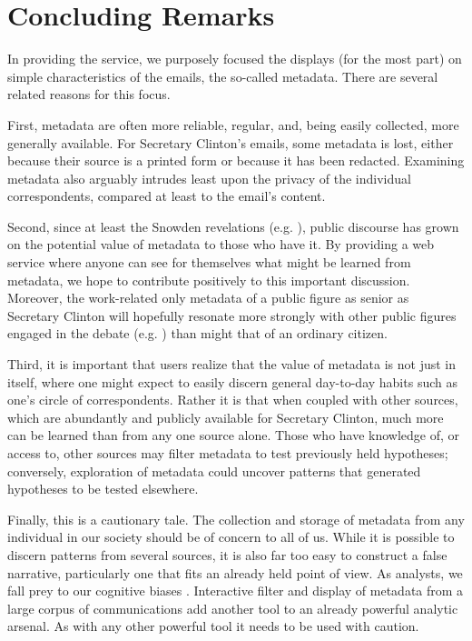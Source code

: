 \documentclass[journal]{vgtc}                %
\begin{document}
\section{Concluding Remarks}
In providing the service, we purposely focused the displays (for the most part) on simple characteristics of the emails, the so-called metadata.  There are several related reasons for this focus.  

First, metadata are often more reliable, regular, and, being easily collected, more generally available.  For Secretary Clinton's emails,  some metadata is lost, either because their source is a printed form or because it has been redacted.  Examining metadata also arguably intrudes least upon the privacy of the individual correspondents, compared at least to the email's content.  

Second, since at least the Snowden revelations (e.g. \cite{NYRsnowdenLeaks}), public discourse has grown on the potential value of metadata to those who have it.  By providing a web service where anyone can see for themselves what might be learned from metadata, we hope to contribute positively to this important discussion.  Moreover, the work-related only metadata of a public figure as senior as Secretary Clinton will hopefully resonate more strongly with other public figures  engaged in the debate (e.g.   \cite{NYRmetadata, ObamaMetadata, JebBushMetadata2015, PompeoMetadata, TrumpMetadata}) than might that of an ordinary citizen.  

Third, it is important that users realize that the value of metadata is not just in itself, where one might expect to easily discern general day-to-day habits such as one's circle of correspondents.  Rather it is that when coupled with other sources, which are abundantly and publicly available for Secretary Clinton, much more can be learned than from any one source alone.  Those who have knowledge of, or access to, other sources may filter metadata to test previously held hypotheses; conversely, exploration of metadata could uncover patterns that generated hypotheses to be tested elsewhere. 

Finally, this is a cautionary tale.  The collection and storage of metadata from any individual in our society should be of concern to all of us.  While it is possible to discern patterns from several sources, it is also far too easy to construct a false narrative, particularly one that fits an already held point of view.  As analysts, we fall prey to our cognitive biases \cite{gilgovichBook}.  Interactive filter and display of metadata from a large corpus of communications add another tool to an already powerful analytic arsenal.  As with any other powerful tool it needs to be used with caution.  


\newpage

%
%
%
%



\end{document}

